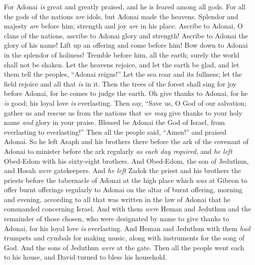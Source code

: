\begin{biblechapter}
\verse For Adonai \textit{is} great and greatly praised, 
and he is feared among all gods.
\verse For all the gods of the nations \textit{are} idols, 
but Adonai made the heavens.
\verse Splendor and majesty \textit{are} before him; 
strength and joy \textit{are} in his place.
\verse Ascribe to Adonai, O clans of the nations, 
ascribe to Adonai glory and strength!
\verse Ascribe to Adonai the glory of his name! 
Lift up an offering and come before him! 
Bow down to Adonai in the splendor of holiness!
\verse Tremble before him, all the earth; 
surely the world shall not be shaken.
\verse Let the heavens rejoice, and let the earth be glad, 
and let them tell the peoples, “Adonai reigns!”
\verse Let the sea roar and its fullness; 
let the field rejoice and all that \textit{is} in it.
\verse Then the trees of the forest shall sing for joy before Adonai, 
for he comes to judge the earth.
\verse Oh give thanks to Adonai, for he \textit{is} good; 
his loyal love \textit{is} everlasting.
\verse Then say, “Save us, O God of our salvation; 
gather us and rescue us from the nations 
that \textit{we may} give thanks to your holy name 
\textit{and} glory in your praise.
\verse Blessed be Adonai the God of Israel, 
from everlasting to everlasting!” Then all the people said, “Amen!” and praised Adonai.
 So he left Asaph and his brothers there before the ark of the covenant of Adonai to minister before the ark regularly \textit{as each day required},
\verse and \textit{he left} Obed-Edom with his sixty-eight brothers. And Obed-Edom, the son of Jeduthun, and Hosah \textit{were} gatekeepers.
\verse And \textit{he left} Zadok the priest and his brothers the priests before the tabernacle of Adonai at the high place which \textit{was} at Gibeon
\verse to offer burnt offerings regularly to Adonai on the altar of burnt offering, morning and evening, according to all that was written in the law of Adonai that he commanded concerning Israel.
\verse And with them \textit{were} Heman and Jeduthun and the remainder of those chosen, who were designated by name to give thanks to Adonai, for his loyal love \textit{is} everlasting.
\verse And Heman and Jeduthun with them \textit{had} trumpets and cymbals for making music, along with instruments for the song of God. And the sons of Jeduthun \textit{were} at the gate.
\verse Then all the people went each to his house, and David turned to bless his household.
\end{biblechapter}

